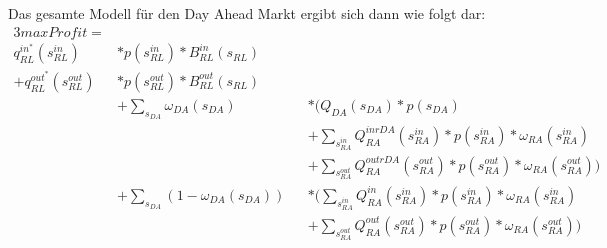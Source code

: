 Das gesamte Modell für den Day Ahead Markt ergibt sich dann wie folgt dar:
\begin{alignat*}{3}
	max Profit  =                  &                                                                                                                                                             \\
	q^{in^*}_{RL} (s^{in}_{RL})    & * p(s^{in}_{RL}) * B^{in}_{RL} (s_{RL})                                                                                                                     \\
	+ q^{out^*}_{RL}(s^{out}_{RL}) & * p(s^{out}_{RL}) * B^{out}_{RL} (s_{RL})                                                                                                                   \\
	                               & + \sum_{s_{DA}}\omega_{DA}(s_{DA})        &  & * \Biggl(Q_{DA}(s_{DA}) * p(s_{DA})                                                                          \\
	                               &                                           &  & + \sum_{s^{in}_{RA}} Q^{inrDA}_{RA}(s^{in}_{RA}) * p(s^{in}_{RA}) * \omega_{RA}(s^{in}_{RA})                 \\
	                               &                                           &  & + \sum_{s^{out}_{RA}} Q^{outrDA}_{RA}(s^{out}_{RA}) * p(s^{out}_{RA}) * \omega_{RA}(s^{out}_{RA})\Biggr)     \\
	                               & + \sum_{s_{DA}}(1-\omega_{DA}(s_{DA}))    &  & * \Biggl(\sum_{s^{in}_{RA}} Q^{in}_{RA}(s^{in}_{RA}) * p(s^{in}_{RA}) *             \omega_{RA}(s^{in}_{RA}) \\
	                               &                                           &  & + \sum_{s^{out}_{RA}} Q^{out}_{RA}(s^{out}_{RA}) * p(s^{out}_{RA}) * \omega_{RA}(s^{out}_{RA}) \Biggr)       \\
\end{alignat*}




